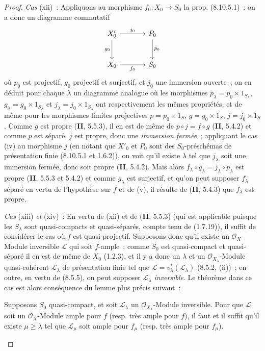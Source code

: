 \begin{proof}
\emph{Cas} (xii)~: Appliquons au morphisme $f_0:X_0\to S_0$ la prop.
(8.10.5.1)~: on a donc un diagramme commutatif
\[
\begin{tikzcd}[column sep=large,row sep=large]
X'_0 \arrow[r,"j_0"] \arrow[d,"g_0"'] & P_0 \arrow[d,"p_0"] \\
X_0 \arrow[r,"f_0"'] & S_0
\end{tikzcd}
\]
où $p_0$ est projectif, $g_0$ projectif et surjectif, et $j_0$ une immersion
ouverte~; on en déduit pour chaque $\lambda$ un diagramme analogue où les
morphismes $p_\lambda=p_0\times1_{S_\lambda}$,
$g_\lambda=g_0\times1_{S_\lambda}$ et $j_\lambda=j_0\times1_{S_\lambda}$ ont
respectivement les mêmes propriétés, et de même pour les morphismes limites
projectives $p=p_0\times1_S$, $g=g_0\times1_S$, $j=j_0\times1_S$. Comme $g$
est propre (\textbf{II}, 5.5.3), il en est de même de $p\circ j=f\circ g$ (\textbf{II}, 5.4.2)
et comme $p$ est séparé, $j$ est propre, donc une \emph{immersion fermée}~;
appliquant le cas (iv) au morphisme $j$ (en notant que $X'_0$ et $P_0$ sont
des $S_0$-préschémas de présentation finie (8.10.5.1 et 1.6.2)), on voit
qu'il existe $\lambda$ tel que $j_\lambda$ soit une immersion fermée, donc
soit propre (\textbf{II}, 5.4.2). Mais alors
$f_\lambda\circ g_\lambda=j_\lambda\circ p_\lambda$ est propre (\textbf{II}, 5.5.3 et
5.4.2) et comme $g_\lambda$ est surjectif, et qu'on peut supposer $f_\lambda$
séparé en vertu de l'hypothèse sur $f$ et de (v), il résulte de (\textbf{II}, 5.4.3)
que $f_\lambda$ est propre.

\emph{Cas} (xiii) \emph{et} (xiv)~: En vertu de (xii) et de (\textbf{II}, 5.5.3) (qui est
applicable puisque les $S_\lambda$ sont quasi-compacts et quasi-séparés,
compte tenu de (1.7.19)), il suffit de
considérer le cas où $f$ est quasi-projectif. Supposons donc qu'il existe un
$\mathcal O_X$-Module inversible $\mathcal L$ qui soit $f$-ample~; comme $S_0$
est quasi-compact et quasi-séparé il en est de même de $X_0$ (1.2.3), et il y
a donc un $\lambda$ et un $\mathcal O_{X_\lambda}$-Module quasi-cohérent
$\mathcal L_\lambda$ de présentation finie tel que
$\mathcal L=v_\lambda^*(\mathcal L_\lambda)$ (8.5.2, (ii))~; en outre, en
vertu de (8.5.5), on peut supposer $\mathcal L_\lambda$ \emph{inversible}. Le théorème
dans ce cas est alors conséquence du lemme plus précis suivant~:

\begin{lemma}[8.10.5.2]
\label{IV.8.10.5.2-fr}
Supposons $S_0$ quasi-compact, et soit $\mathcal L_\lambda$ un
$\mathcal O_{X_\lambda}$-Module inversible. Pour que $\mathcal L$ soit un
$\mathcal O_X$-Module ample pour $f$ \textup{(resp.} très ample pour $f$\textup{)}, il faut et
il suffit qu'il existe $\mu\geq\lambda$ tel que $\mathcal L_\mu$ soit ample
pour $f_\mu$ \textup{(resp.} très ample pour $f_\mu$\textup{)}.
\end{lemma}


\end{proof}
